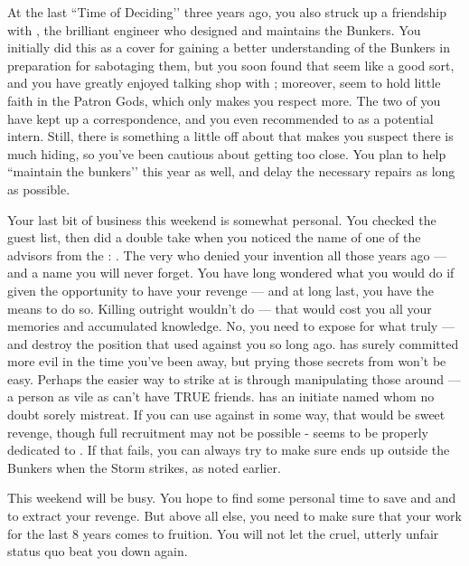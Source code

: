 \documentclass[char]{GL2020}
\begin{document}
At the last ``Time of Deciding’’ three years ago, you also struck up a friendship with \cBunker{\full}, the brilliant engineer who designed and maintains the Bunkers. You initially did this as a cover for gaining a better understanding of the Bunkers in preparation for sabotaging them, but you soon found that \cBunker{\they} seem\cBunker{\verbs} like a good sort, and you have greatly enjoyed talking shop with \cBunker{\them}; moreover, \cBunker{\they} seem\cBunker{\verbs} to hold little faith in the Patron Gods, which only makes you respect \cBunker{\them} more. The two of you have kept up a correspondence, and you even recommended \cTechStar{} to \cTechStar{\them} as a potential intern. Still, there is something a little off about \cBunker{} that makes you suspect there is much \cBunker{\theyare} hiding, so you've been cautious about getting too close. You plan to help \cBunker{\them} ``maintain the bunkers’’ this year as well, and delay the necessary repairs as long as possible.

Your last bit of business this weekend is somewhat personal. You checked the guest list, then did a double take when you noticed the name of one of the advisors from the \pTech{}: \cAntiChup{\full}. The very \cAntiChup{\cleric} who denied your invention all those years ago — and a name you will never forget. You have long wondered what you would do if given the opportunity to have your revenge — and at long last, you have the means to do so. Killing \cAntiChup{} outright wouldn't do — that would cost you all your memories and accumulated knowledge. No, you need to expose \cAntiChup{\them} for what \cAntiChup{\they} truly \cAntiChup{\are} — and destroy the position that \cAntiChup{\they} used against you so long ago. \cAntiChup{} has surely committed more evil in the time you've been away, but prying those secrets from \cAntiChup{\them} won't be easy. Perhaps the easier way to strike at \cAntiChup{\them} is through manipulating those around \cAntiChup{\them} — a person as vile as \cAntiChup{} can't have TRUE friends. \cAntiChup{} has an initiate named \cScholarship{\full} whom \cAntiChup{\they} no doubt sorely mistreat\cAntiChup{\verbs}. If you can use \cScholarship{\them} against \cAntiChup{\them} in some way, that would be sweet revenge, though full recruitment may not be possible - \cScholarship{} seems to be properly dedicated to \cTechGod{}. If that fails, you can always try to make sure  \cAntiChup{} ends up outside the Bunkers when the Storm strikes, as noted earlier. 

This weekend will be busy. You hope to find some personal time to save \cHeadScientist{} and \cTechStar{} and to extract your revenge. But above all else, you need to make sure that your work for the last 8 years comes to fruition. You will not let the cruel, utterly unfair status quo beat you down again.
\end{document}
